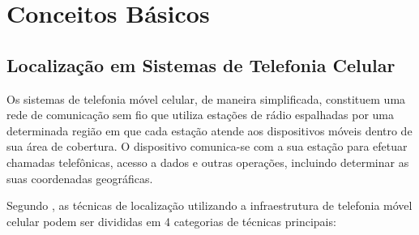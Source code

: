 \documentclass[12pt]{article}
\begin{document}
    \newpage
    \section{Conceitos Básicos}
    \label{sec:conceitosBasicos}

        \subsection{Localização em Sistemas de Telefonia Celular}
        \label{sec:localizacao}
        
        Os sistemas de telefonia móvel celular, de maneira simplificada, constituem uma rede de comunicação sem fio que utiliza estações de rádio espalhadas por uma determinada região em que cada estação atende aos dispositivos móveis dentro de sua área de cobertura. O dispositivo comunica-se com a sua estação para efetuar chamadas telefônicas, acesso a dados e outras operações, incluindo determinar as suas coordenadas geográficas. 
        
        Segundo \cite{locationSystems2008}, as técnicas de localização utilizando a infraestrutura de telefonia móvel celular podem ser divididas em 4 categorias de técnicas principais:
        
\end{document}
